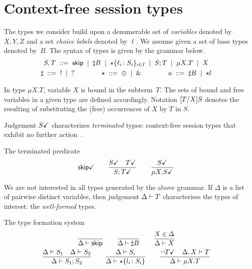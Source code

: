 \section{Context-free session types}
\label{sec:contextfreesession}

The types we consider build upon a denumerable set of \emph{variables}
denoted by $X,Y,Z$ and a set \emph{choice labels} denoted by
$\ell$. We assume given a set of base types denoted by~$B$.
The syntax of types is given by the grammar below.
%
\begin{gather*}
  S,T \grmeq \skipk \grmor \sharp B \grmor 
  \star\{\ell_i\colon S_i\}_{i\in I} \grmor S;T \grmor \mu X.T \grmor X
  \\
  \sharp \grmeq {}! \grmor {}? 
  \qquad \qquad
  \star  \grmeq \oplus \grmor {}\&
  \qquad \qquad
  a \grmeq \sharp B \grmor \star l %
\end{gather*}

In type $\mu X.T$, variable $X$ is bound in the subterm~$T$. The sets
of bound and free variables in a given type are defined
accordingly. Notation $\subs{T}{X}S$ denotes the resulting of
substituting the (free) occurrences of $X$ by $T$ in $S$.

Judgement $\DONE S$ characterizes \emph{terminated} types:
context-free session types that exhibit no further
action~\cite{DBLP:journals/jacm/AcetoH92}.

\noindent The terminated predicate\hfill{} 
%
\begin{gather*}
  \DONE{\skipk}
  \qquad
  \frac{\DONE{S} \quad \DONE{T}}{\DONE{S; T}}
  \qquad
  \frac{\DONE S}{\DONE{\mu X.S}}
\end{gather*}

We are not interested in all types generated by the above grammar.
%
If $\Delta$ is a list of pairwise distinct variables, then judgement
$\isType T$ characterises the types of interest: the
\emph{well-formed} types.

\noindent The type formation system \hfill{}
%
\begin{gather*}
  \frac{} 
  {
    \isType \skipk
  }
  \qquad
  \frac{}
  {
    \isType {\sharp B}
  }
  \qquad
  \frac{
    X \in \Delta
  }{
    \isType{X}
  }
  \\
  \frac{
    \isType{S_1}
    \quad
    \isType{S_2}
  }{
    \isType{S_1;S_2}
  }
  \qquad
  \frac{
    \isType{S_i}
  }{
    \isType{\star 
      \{ l_i \colon S_i\}}
  }
  \qquad
  \frac{
    \neg\DONE T
    \quad 
    \isType [\Delta, X] T
  }{
    \isType {\mu X. T}
  }
\end{gather*}

